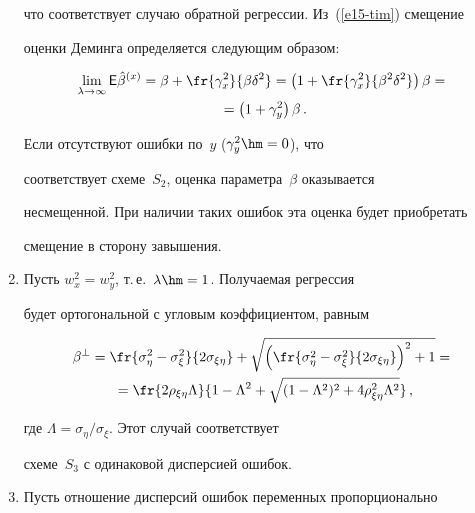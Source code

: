 \begin{multicols}{2}
\begin{enumerate}[1.]
\begin{equation}
\end{equation}

что соответствует случаю обратной регрессии. Из~(\ref{e15-tim}) смещение

оценки Деминга определяется следующим образом:

\begin{multline*}

\lim\limits_{\lambda\to\infty} {\sf E} \hat{\beta}^{(x)} = \beta

+\fr{\gamma_x^2}{\beta\delta^2} = \left( 1+\fr{\gamma_x^2}{\beta^2\delta^2}

\right) \beta ={}\\

{}=\left(1+\gamma_y^2\right) \beta\,.

\end{multline*}



  Если отсутствуют ошибки по~$y$ ($\gamma_y^2\hm=0$), что

соответствует схеме~$S_2$, оценка параметра~$\beta$ оказывается

несмещенной. При наличии таких ошибок эта оценка будет приобретать

смещение в сторону завышения.

\item Пусть $w_x^2=w_y^2$, т.\,е.\ $\lambda\hm=1$. Получаемая регрессия

будет ортогональной с угловым коэффициентом, равным

\begin{multline}

\beta^\perp = \fr{\sigma_\eta^2-\sigma_\xi^2}{2\sigma_{\xi\eta}} +

\sqrt{\left(\fr{\sigma_\eta^2-\sigma_\xi^2}{2\sigma_{\xi\eta}}\right)^2+1}={}\\

{}=

\fr{2\rho_{\xi\eta}\Lambda}{1-\Lambda^2 +\sqrt{(1-\Lambda^2)^2

+4\rho^2_{\xi\eta} \Lambda^2}}\,,

\label{e16-tim}

\end{multline}

где $\Lambda=\sigma_\eta/\sigma_\xi$. Этот случай соответствует

схеме~$S_3$ с одинаковой дисперсией ошибок.

\item Пусть отношение дисперсий ошибок переменных пропорционально


\end{enumerate}
\end{multicols}
